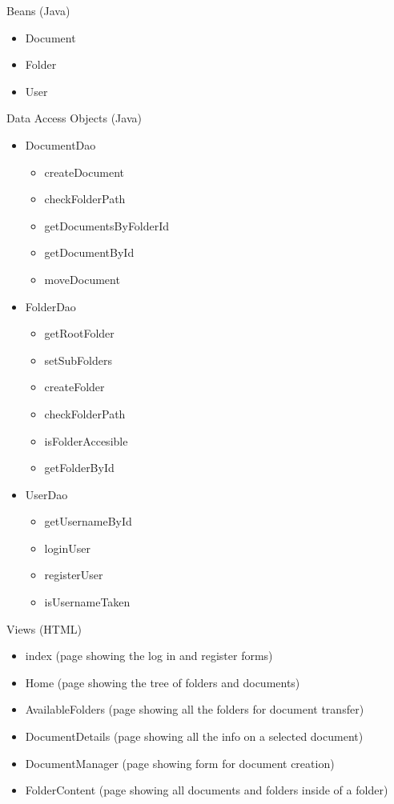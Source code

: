 \documentclass[a4paper,12pt]{article}
\begin{document}
\begin{multicols}{2}
Beans (Java)
\begin{itemize}
	\item{Document}
	\item{Folder}
	\item{User}
\end{itemize}
Data Access Objects (Java)
\begin{itemize}
	\item{DocumentDao}
		\begin{itemize}
			\item{createDocument}
			\item{checkFolderPath}
			\item{getDocumentsByFolderId}
			\item{getDocumentById}
			\item{moveDocument}
		\end{itemize}
	\item{FolderDao}
		\begin{itemize}
			\item{getRootFolder}
			\item{setSubFolders}
			\item{createFolder}
			\item{checkFolderPath}
			\item{isFolderAccesible}
			\item{getFolderById}
		\end{itemize}
	\item{UserDao}
		\begin{itemize}
			\item{getUsernameById}
			\item{loginUser}
			\item{registerUser}
			\item{isUsernameTaken}
		\end{itemize}
\end{itemize}
Views (HTML)
\begin{itemize}
	\item{index} (page showing the log in and register forms)
	\item{Home} (page showing the tree of folders and documents)
	\item{AvailableFolders (page showing all the folders for document transfer)}
	\item{DocumentDetails (page showing all the info on a selected document)}
	\item{DocumentManager (page showing form for document creation)}
	\item{FolderContent (page showing all documents and folders inside of a folder)}

\end{itemize}
\end{multicols}
\end{document}
